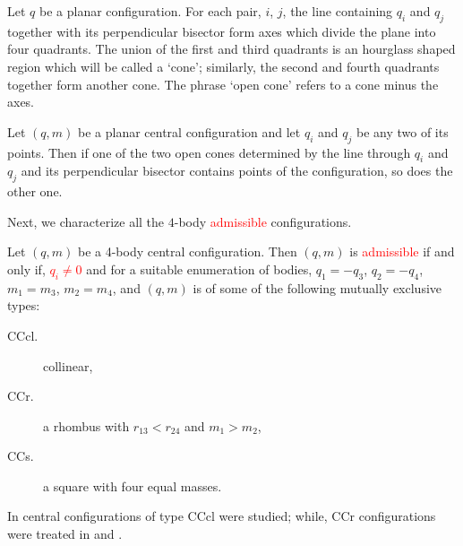 \documentclass[smallcondensed]{svjour3}
\begin{document}
\begin{definition}\label{def:bis.per}
Let $q$ be a planar configuration. For each pair, $i$, $j$, the line
containing $q_i$ and $q_j$ together with its perpendicular bisector form axes which
divide the plane into four quadrants. The union of the first and third quadrants
is an hourglass shaped region which will be called a `cone'; similarly,
the second and fourth quadrants together form another cone. The phrase `open
cone' refers to a cone minus the axes.
\end{definition}

\begin{theorem}\label{thm:bisector.moeckel}
Let $(q,m)$ be a planar central configuration and let
$q_i$ and $q_j$ be any two of its points. Then if one of the two open cones determined
by the line through $q_i$ and $q_j$ and its perpendicular bisector contains points of
the configuration, so does the other one.
\end{theorem}

Next, we characterize all the $4$-body \textcolor{red}{admissible}  configurations.

\begin{theorem}\label{thm:caracterizacion4}
Let $(q,m)$ be a 4-body central configuration. Then $(q,m)$ is  \textcolor{red}{admissible} if and only if, \textcolor{red}{$q_i\neq 0$} and  for a suitable enumeration  of bodies,   $q_1=-q_3$, $q_2=-q_4$, $m_1=m_3$,  $m_2=m_4$, and  $(q,m)$ is of some of the following mutually exclusive types:
\begin{description}
\item[CCcl.]   collinear,
\item[CCr.]  a rhombus with $r_{13}<r_{24}$ and $m_1>m_2$,
\item[CCs.]  a square with four equal masses.
\end{description}
\end{theorem}




\begin{remark} In \cite{shoaib2011collinear}  central configurations of type CCcl were studied; while,  CCr configurations were treated in \cite{long2002four} and \cite{perez2007convex}.

\end{remark}
\end{document}
